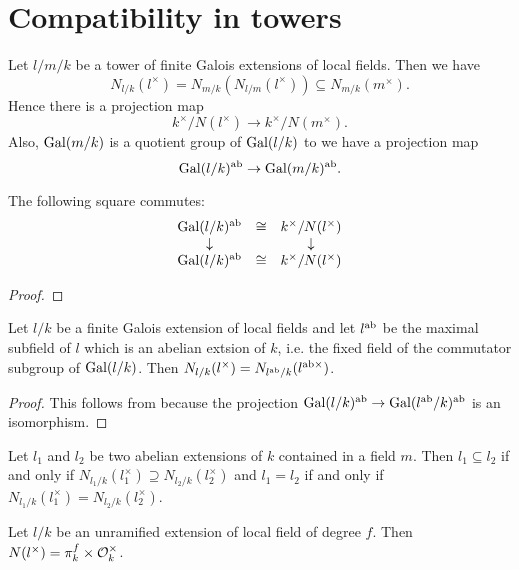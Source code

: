 \section{Compatibility in towers}

Let $l / m / k$ be a tower of finite Galois extensions of local fields.
Then we have
\[
	N_{l/k} (l^\times) = N_{m/k}(N_{l/m}(l^\times)) \subseteq N_{m/k}(m^\times).
\]
Hence there is a projection map
\[
	k^\times / N(l^\times) \to k^\times / N(m^\times).
\]
Also, $\mathrm{Gal}(m/k)$ is a quotient group of $\mathrm{Gal}(l/k)$ to we have a projection map
\[
	\mathrm{Gal}(l/k)^{\mathrm{ab}} \to \mathrm{Gal}(m/k)^{\mathrm{ab}}.
\]

\begin{lemma} \label{lem:local compatibility in towers}
	The following square commutes:
	\[
		\begin{matrix}
			\mathrm{Gal}(l/k)^{\mathrm{ab}} & \cong & k^\times / N(l^\times) \\
			\downarrow && \downarrow \\
			\mathrm{Gal}(l/k)^{\mathrm{ab}} & \cong & k^\times / N(l^\times)
		\end{matrix}
	\]
\end{lemma}

\begin{proof}
\end{proof}


\begin{theorem} \label{thm:local norm limitation}
	Let $l/k$ be a finite Galois extension of local fields and let $l^{\mathrm{ab}}$ be the
	maximal subfield of $l$ which is an abelian extsion of $k$, i.e. the fixed field of
	the commutator subgroup of $\mathrm{Gal}(l/k)$.
	Then $N_{l/k}(l^\times) = N_{l^{\mathrm{ab}}/k}(l^{\mathrm{ab}\times})$.
\end{theorem}

\begin{proof}
	This follows from \label{lem:local compatibility in towers} because the projection
	$\mathrm{Gal}(l/k)^{\mathrm{ab}} \to \mathrm{Gal}(l^{\mathrm{ab}}/k)^{\mathrm{ab}}$ is an isomorphism.
\end{proof}



\begin{theorem} \label{lem:local abelian classification}
	Let $l_1$ and $l_2$ be two abelian extensions of $k$ contained in a field $m$.
	Then $l_1 \subseteq l_2$ if and only if $N_{l_1/k}(l_1^\times) \supseteq N_{l_2/k}(l_2^\times)$
	and $l_1 = l_2$ if and only if $N_{l_1/k}(l_1^\times) = N_{l_2/k}(l_2^\times)$.
\end{theorem}


\begin{example}
	Let $l/k$ be an unramified extension of local field of degree $f$.
	Then $N(l^\times) = \pi_k^f \times {\mathcal O}_k^\times$.
\end{example}

